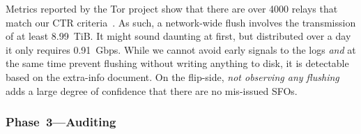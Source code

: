 Metrics reported by the Tor project show that there are over 4000 relays that
match our CTR criteria~\cite{relay-by-flag}.  As such, a network-wide flush
involves the transmission of at least 8.99~TiB.  It might sound daunting at
first, but distributed over a day it only requires 0.91~Gbps.  While we cannot
avoid early signals to the logs \emph{and} at the same time prevent flushing
without writing anything to disk, it is detectable based on the extra-info
document.  On the flip-side, \emph{not observing any flushing} adds a large
degree of confidence that there are no mis-issued SFOs.

\subsubsection{Phase~3---Auditing} \label{sec:auditor:analysis:phase3}
%


